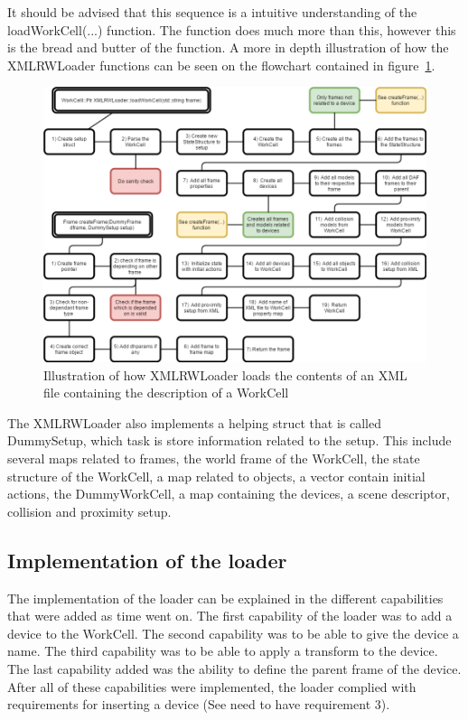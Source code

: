 It should be advised that this sequence is a intuitive understanding of the loadWorkCell(...) function. The function does much more than this, however this is the bread and butter of the function. A more in depth illustration of how the XMLRWLoader functions can be seen on the flowchart contained in figure~\ref{fig:ComplexLoadWC}.

\begin{figure}[h]
	\centering
	\includegraphics[scale=0.50]{Figures/ComplexLoadWC.png}
	\caption{Illustration of how XMLRWLoader loads the contents of an XML file containing the description of a WorkCell}
	\label{fig:ComplexLoadWC}
\end{figure}

The XMLRWLoader also implements a helping struct that is called DummySetup, which task is store information related to the setup. This include several maps related to frames, the world frame of the WorkCell, the state structure of the WorkCell, a map related to objects, a vector contain initial actions, the DummyWorkCell, a map containing the devices, a scene descriptor, collision and proximity setup.

\subsection{Implementation of the loader}
The implementation of the loader can be explained in the different capabilities that were added as time went on. The first capability of the loader was to add a device to the WorkCell. The second capability was to be able to give the device a name. The third capability was to be able to apply a transform to the device. The last capability added was the ability to define the parent frame of the device. After all of these capabilities were implemented, the loader complied with requirements for inserting a device (See need to have requirement 3).

